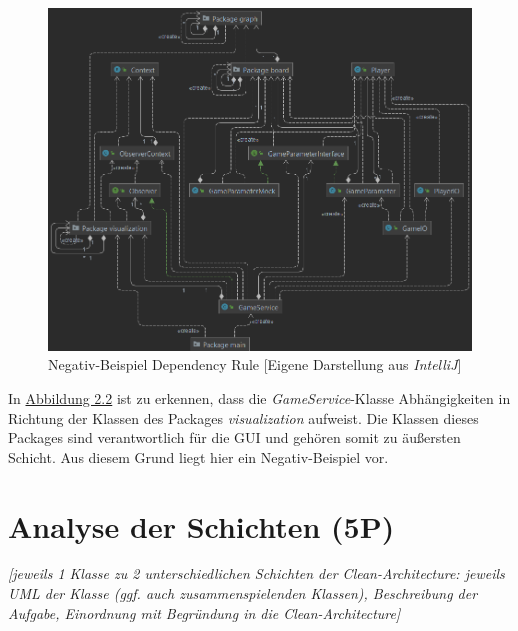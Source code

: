 \begin{figure}[htbp]
\centering
\centerline{\includegraphics[scale=.5]{dependencyrule_klasse_gameservice}}
\caption{Negativ-Beispiel Dependency Rule [Eigene Darstellung aus \emph{IntelliJ}]}
\label{fig:dependencyrulenegativ}
\end{figure}

\noindent In \hyperref[fig:dependencyrulepositiv]{Abbildung 2.2} ist zu erkennen, dass die \emph{GameService}-Klasse Abhängigkeiten in Richtung der Klassen des Packages \emph{visualization} aufweist. Die Klassen dieses Packages sind verantwortlich für die GUI und gehören somit zu äußersten Schicht. Aus diesem Grund liegt hier ein Negativ-Beispiel vor.

\newpage

\section{Analyse der Schichten (5P)}
\emph{[jeweils 1 Klasse zu 2 unterschiedlichen Schichten der Clean-Architecture: jeweils UML der Klasse
(ggf. auch zusammenspielenden Klassen), Beschreibung der Aufgabe, Einordnung mit Begründung in
die Clean-Architecture]}

